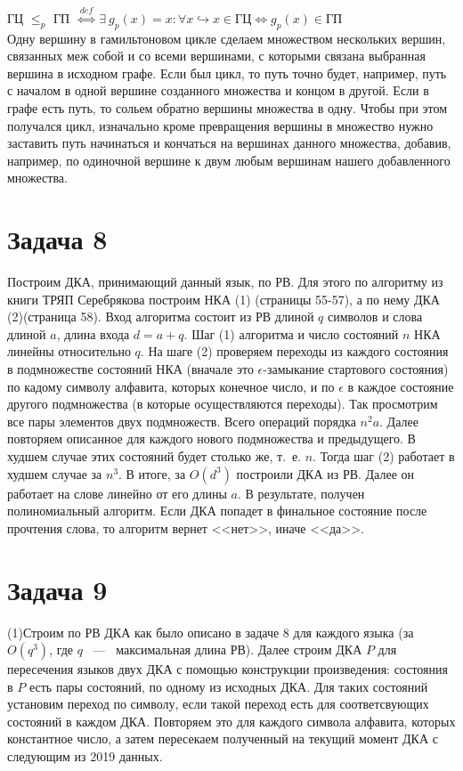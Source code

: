 \documentclass[a4paper,12pt]{article} %
\begin{document}
ГЦ $\leq _p$ ГП $~\overset{def}\Leftrightarrow~ \exists ~g_p(x) = x: \forall x \hookrightarrow x \in \text{ГЦ} \Leftrightarrow g_p(x) \in \text{ГП}$\\
Одну вершину в гамильтоновом цикле сделаем множеством нескольких вершин, связанных меж собой и со всеми вершинами, с которыми связана выбранная вершина в исходном графе. Если был цикл, то путь точно будет, например, путь с началом в одной вершине созданного множества и концом в другой. Если в графе есть путь, то сольем обратно вершины множества в одну. Чтобы при этом получался цикл, изначально кроме превращения вершины в множество нужно заставить путь начинаться и кончаться на вершинах данного множества, добавив, например, по одиночной вершине к двум любым вершинам нашего добавленного множества. \\

\section*{Задача 8}
Построим ДКА, принимающий данный язык, по РВ. Для этого по алгоритму из книги ТРЯП Серебрякова построим НКА (1) (страницы 55-57), а по нему ДКА (2)(страница 58). Вход алгоритма состоит из РВ длиной $q$ символов и слова длиной $a$, длина входа $d = a+q$. Шаг (1) алгоритма и число состояний $n$ НКА линейны относительно $q$. На шаге (2) проверяем переходы из каждого состояния в подмножестве состояний НКА (вначале это $\epsilon$-замыкание стартового состояния) по кадому символу алфавита, которых конечное число, и по $\epsilon$ в каждое состояние другого подмножества (в которые осуществляются переходы). Так просмотрим все пары элементов двух подмножеств. Всего операций порядка $n^2a$. Далее повторяем описанное для каждого нового подмножества и предыдущего. В худшем случае этих состояний будет столько же, т.~е. $n$. Тогда шаг (2) работает в худшем случае за $n^3$. В итоге, за $O(d^3)$ построили ДКА из РВ. Далее он работает на слове линейно от его длины $a$. В результате, получен полиномиальный алгоритм. Если ДКА попадет в финальное состояние после прочтения слова, то алгоритм вернет <<нет>>, иначе <<да>>.\\

\section*{Задача 9}
(1)Строим по РВ ДКА как было описано в задаче 8 для каждого языка (за $O(q^3)$, где $q$ ~---~ максимальная длина РВ). Далее строим ДКА $P$ для пересечения языков двух ДКА с помощью конструкции произведения: состояния в $P$ есть пары состояний, по одному из исходных ДКА. Для таких состояний установим переход по символу, если такой переход есть для соответсвующих состояний в каждом ДКА. Повторяем это для каждого символа алфавита, которых константное число, а затем пересекаем полученный на текущий момент ДКА с следующим из 2019 данных.\\
\end{document}
